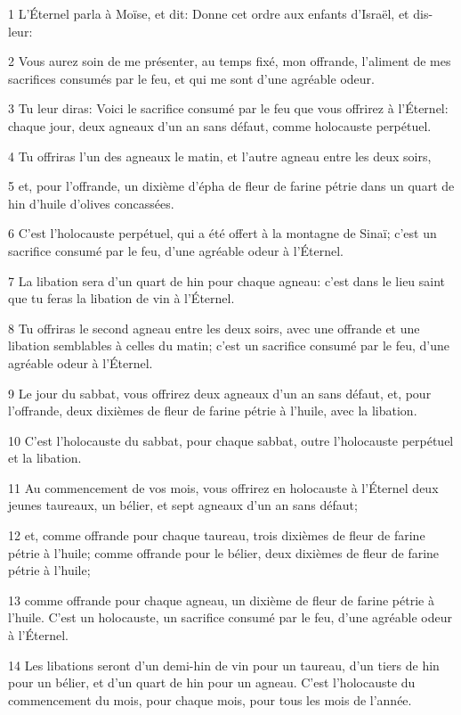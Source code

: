 \par 1 L'Éternel parla à Moïse, et dit: Donne cet ordre aux enfants d'Israël, et dis-leur:
\par 2 Vous aurez soin de me présenter, au temps fixé, mon offrande, l'aliment de mes sacrifices consumés par le feu, et qui me sont d'une agréable odeur.
\par 3 Tu leur diras: Voici le sacrifice consumé par le feu que vous offrirez à l'Éternel: chaque jour, deux agneaux d'un an sans défaut, comme holocauste perpétuel.
\par 4 Tu offriras l'un des agneaux le matin, et l'autre agneau entre les deux soirs,
\par 5 et, pour l'offrande, un dixième d'épha de fleur de farine pétrie dans un quart de hin d'huile d'olives concassées.
\par 6 C'est l'holocauste perpétuel, qui a été offert à la montagne de Sinaï; c'est un sacrifice consumé par le feu, d'une agréable odeur à l'Éternel.
\par 7 La libation sera d'un quart de hin pour chaque agneau: c'est dans le lieu saint que tu feras la libation de vin à l'Éternel.
\par 8 Tu offriras le second agneau entre les deux soirs, avec une offrande et une libation semblables à celles du matin; c'est un sacrifice consumé par le feu, d'une agréable odeur à l'Éternel.
\par 9 Le jour du sabbat, vous offrirez deux agneaux d'un an sans défaut, et, pour l'offrande, deux dixièmes de fleur de farine pétrie à l'huile, avec la libation.
\par 10 C'est l'holocauste du sabbat, pour chaque sabbat, outre l'holocauste perpétuel et la libation.
\par 11 Au commencement de vos mois, vous offrirez en holocauste à l'Éternel deux jeunes taureaux, un bélier, et sept agneaux d'un an sans défaut;
\par 12 et, comme offrande pour chaque taureau, trois dixièmes de fleur de farine pétrie à l'huile; comme offrande pour le bélier, deux dixièmes de fleur de farine pétrie à l'huile;
\par 13 comme offrande pour chaque agneau, un dixième de fleur de farine pétrie à l'huile. C'est un holocauste, un sacrifice consumé par le feu, d'une agréable odeur à l'Éternel.
\par 14 Les libations seront d'un demi-hin de vin pour un taureau, d'un tiers de hin pour un bélier, et d'un quart de hin pour un agneau. C'est l'holocauste du commencement du mois, pour chaque mois, pour tous les mois de l'année.
